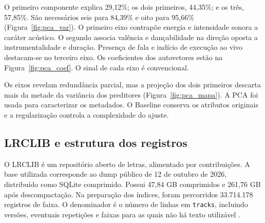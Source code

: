 O primeiro componente explica 29,12\%; os dois primeiros, 44,35\%; e os três, 57,85\%. São necessários seis para 84,39\% e oito para 95,66\% (Figura~\ref{fig:pca_var}). O primeiro eixo contrapõe energia e intensidade sonora a caráter acústico. O segundo associa valência e dançabilidade na direção oposta a instrumentalidade e duração. Presença de fala e indício de execução ao vivo destacam-se no terceiro eixo. Os coeficientes dos autovetores estão na Figura~\ref{fig:pca_coef}. O sinal de cada eixo é convencional.


Os eixos revelam redundância parcial, mas a projeção dos dois primeiros descarta mais da metade da variância dos preditores (Figura~\ref{fig:pca_mapa}). A PCA foi usada para caracterizar os metadados. O Baseline conserva os atributos originais e a regularização controla a complexidade do ajuste.

\FloatBarrier

\subsection{LRCLIB e estrutura dos registros}
O LRCLIB é um repositório aberto de letras, alimentado por contribuições. A base utilizada corresponde ao dump público de 12 de outubro de 2026, distribuído como SQLite comprimido. Possui 47,84 GB comprimidos e 261,76 GB após descompactação. Na preparação dos índices, foram percorridos 33.714.178 registros de faixa. O denominador é o número de linhas em \texttt{tracks}, incluindo versões, eventuais repetições e faixas para as quais não há texto utilizável \cite{lrclib}.

